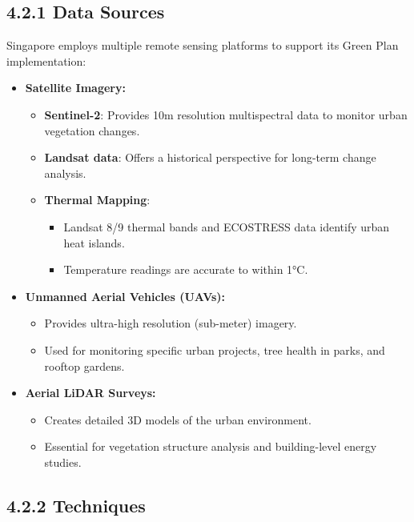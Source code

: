 \documentclass[
  letterpaper,
  DIV=11,
  numbers=noendperiod]{scrreprt}
\providecommand{\tightlist}{%
  \setlength{\itemsep}{0pt}\setlength{\parskip}{0pt}}\usepackage{longtable,booktabs,array}
\begin{document}
\subsection{4.2.1 Data Sources}\label{data-sources}

Singapore employs multiple remote sensing platforms to support its Green
Plan implementation:

\begin{itemize}
\tightlist
\item
  \textbf{Satellite Imagery:}

  \begin{itemize}
  \tightlist
  \item
    \textbf{Sentinel-2}: Provides 10m resolution multispectral data to
    monitor urban vegetation changes.
  \item
    \textbf{Landsat data}: Offers a historical perspective for long-term
    change analysis.
  \item
    \textbf{Thermal Mapping}:

    \begin{itemize}
    \tightlist
    \item
      Landsat 8/9 thermal bands and ECOSTRESS data identify urban heat
      islands.
    \item
      Temperature readings are accurate to within 1°C.
    \end{itemize}
  \end{itemize}
\item
  \textbf{Unmanned Aerial Vehicles (UAVs):}

  \begin{itemize}
  \tightlist
  \item
    Provides ultra-high resolution (sub-meter) imagery.
  \item
    Used for monitoring specific urban projects, tree health in parks,
    and rooftop gardens.
  \end{itemize}
\item
  \textbf{Aerial LiDAR Surveys:}

  \begin{itemize}
  \tightlist
  \item
    Creates detailed 3D models of the urban environment.
  \item
    Essential for vegetation structure analysis and building-level
    energy studies.
  \end{itemize}
\end{itemize}

\subsection{4.2.2 Techniques}\label{techniques}
\end{document}
